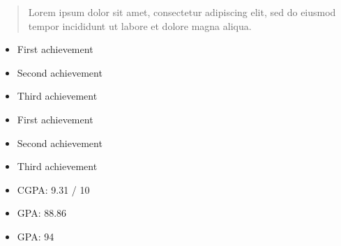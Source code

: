\documentclass[10pt,a4paper,ragged2e,withhyper]{altacv}
\begin{document}
\begin{paracol}{2}
    \newpage

    \switchcolumn

    \begin{quote}
        Lorem ipsum dolor sit amet, consectetur adipiscing elit, sed do eiusmod tempor incididunt ut labore et dolore magna aliqua.
    \end{quote}

    \begin{itemize}
        \item First achievement
        \item Second achievement
        \item Third achievement
    \end{itemize}
    \divider

    \begin{itemize}
        \item First achievement
        \item Second achievement
        \item Third achievement
    \end{itemize}

    \begin{itemize}
        \item CGPA: 9.31 / 10
    \end{itemize}

    \begin{itemize}
        \item GPA: 88.86
    \end{itemize}

    \begin{itemize}
        \item GPA: 94
    \end{itemize}


\end{paracol}
\end{document}
